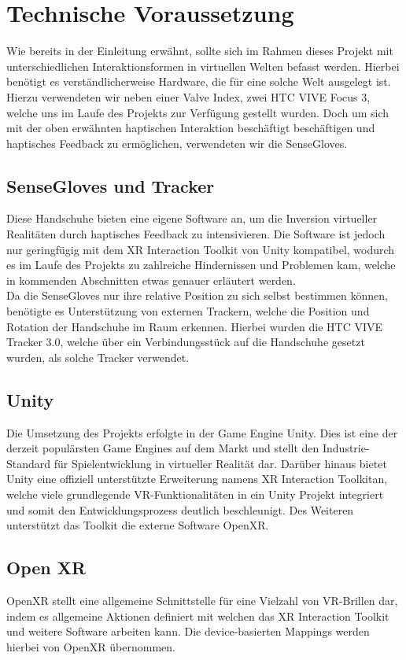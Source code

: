 \section{Technische Voraussetzung}
Wie bereits in der Einleitung erwähnt, sollte sich im Rahmen dieses Projekt mit unterschiedlichen Interaktionsformen in virtuellen Welten befasst werden. Hierbei benötigt es verständlicherweise Hardware, die für eine solche Welt ausgelegt ist. Hierzu verwendeten wir neben einer Valve Index, zwei HTC VIVE Focus 3, welche uns im Laufe des Projekts zur Verfügung gestellt wurden. Doch um sich mit der oben erwähnten haptischen Interaktion beschäftigt beschäftigen und haptisches Feedback zu ermöglichen, verwendeten wir die \dq SenseGloves\dq . 

\subsection{SenseGloves und Tracker}
Diese Handschuhe bieten eine eigene Software an, um die Inversion virtueller Realitäten durch haptisches Feedback zu intensivieren. Die Software ist jedoch nur geringfügig mit dem XR Interaction Toolkit von Unity kompatibel, wodurch es im Laufe des Projekts zu zahlreiche Hindernissen und Problemen kam, welche in kommenden Abschnitten etwas genauer erläutert werden.\\ 
\noindent Da die SenseGloves nur ihre relative Position zu sich selbst bestimmen können, benötigte es Unterstützung von externen Trackern, welche die Position und Rotation der Handschuhe im Raum erkennen. Hierbei wurden die \dq HTC VIVE Tracker 3.0\dq , welche über ein Verbindungsstück auf die Handschuhe gesetzt wurden, als solche Tracker verwendet.

\newpage \noindent
\subsection{Unity}
Die Umsetzung des Projekts erfolgte in der Game Engine \dq Unity\dq. Dies ist eine der derzeit populärsten Game Engines auf dem Markt und stellt den Industrie-Standard für Spielentwicklung in virtueller Realität dar. Darüber hinaus bietet Unity eine offiziell unterstützte Erweiterung namens \dq XR Interaction Toolkit\dq an, welche viele grundlegende VR-Funktionalitäten in ein Unity Projekt integriert und somit den Entwicklungsprozess deutlich beschleunigt. Des Weiteren unterstützt das Toolkit die externe Software \dq OpenXR\dq.

\subsection{Open XR}
OpenXR stellt eine allgemeine Schnittstelle für eine Vielzahl von VR-Brillen dar, indem es allgemeine Aktionen definiert mit welchen das XR Interaction Toolkit und weitere Software arbeiten kann. Die device-basierten Mappings werden hierbei von OpenXR übernommen.

